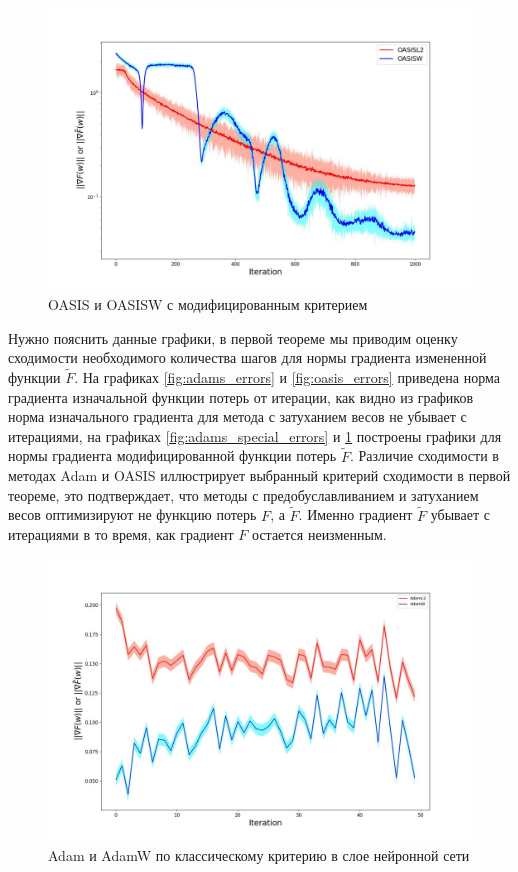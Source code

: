 \begin{figure}[h!]
\centering
\includegraphics[width=0.7\linewidth]{pictures/fig2_oasis.jpg}
\captionsetup{justification=centering,margin=0.5cm}
\caption{OASIS и OASISW с модифицированным критерием}
\label{fig:oasis_special_errors}
\end{figure}

Нужно пояснить данные графики, в первой теореме мы приводим оценку сходимости необходимого количества шагов для нормы градиента измененной функции $\tilde{F}$. На графиках \ref{fig:adams_errors} и \ref{fig:oasis_errors} приведена норма градиента изначальной функции потерь от итерации, как видно из графиков норма изначального градиента для метода с затуханием весов не убывает с итерациями, на графиках \ref{fig:adams_special_errors} и \ref{fig:oasis_special_errors} построены графики для нормы градиента модифицированной функции потерь $\tilde{F}$. Различие сходимости в методах Adam и OASIS иллюстрирует выбранный критерий сходимости в первой теореме, это подтверждает, что методы с предобуславливанием и затуханием весов оптимизируют не функцию потерь $F$, а $\tilde{F}$. Именно градиент $\tilde{F}$ убывает с итерациями в то время, как градиент $F$ остается неизменным.

\begin{figure}[h!]
\centering
\includegraphics[width=0.7\linewidth]{pictures/net_ADAML2.jpg}
\captionsetup{justification=centering,margin=0.5cm}
\caption{Adam и AdamW по классическому критерию в слое нейронной сети}
\label{fig:adam_net_errors}
\end{figure}

